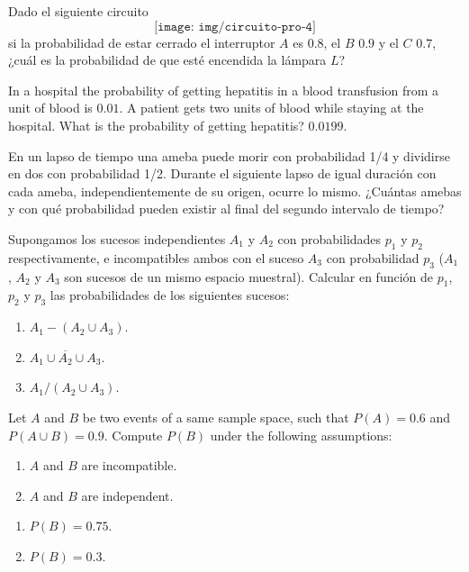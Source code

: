 {Dado el siguiente circuito
\[
\texttt{[image: img/circuito-pro-4]}
 \]
si la probabilidad de estar cerrado el interruptor $A$ es $0.8$, el $B$ $0.9$ y el $C$ $0.7$, ¿cuál es la probabilidad
de que esté encendida la lámpara $L$?
}
{}
{}


{In a hospital the probability of getting hepatitis in a blood transfusion from a unit of blood is $0.01$.
A patient gets two units of blood while staying at the hospital.
What is the probability of getting hepatitis?
}
{$0.0199$.}
{}


{En un lapso de tiempo una ameba puede morir con probabilidad 1/4 y dividirse en dos con probabilidad 1/2.
Durante el siguiente lapso de igual duración con cada ameba, independientemente de su origen, ocurre lo mismo.
¿Cuántas amebas y con qué probabilidad pueden existir al final del segundo intervalo de tiempo?
}
{}
{}


{Supongamos los sucesos independientes $A_{1}$ y $A_{2}$ con probabilidades $p_{1}$ y $p_{2}$ respectivamente, e
incompatibles ambos con el suceso $A_{3}$ con probabilidad $p_{3}$ ($A_{1}$, $A_{2}$ y $A_{3}$ son sucesos de un mismo
espacio muestral).
Calcular en función de $p_{1}$, $p_{2}$ y $p_{3}$ las probabilidades de los siguientes sucesos:
\begin{enumerate}
\item  $A_{1}-(A_{2}\cup A_{3})$.
\item  $\overline{A_{1}\cup A_{2}\cup A_{3}}$.
\item  $A_{1}/(A_{2}\cup A_{3})$.
\end{enumerate}
}
{}
{}


{Let $A$ and $B$ be two events of a same sample space, such that $P(A)=0.6$ and $P(A\cup B)=0.9.$
Compute $P(B)$ under the following assumptions:
\begin{enumerate}
\item $A$ and $B$ are incompatible.
\item $A$ and $B$ are independent.
\end{enumerate}
}
{
\begin{enumerate}
\item $P(B)=0.75$.
\item $P(B)=0.3$.
\end{enumerate}
}
{}


